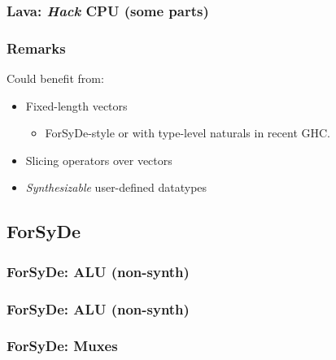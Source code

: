 \documentclass{beamer}
\begin{document}
            \begin{frame}
                \frametitle{Lava: \emph{Hack} CPU (some parts)}
            \end{frame}

            \begin{frame}
                \frametitle{Remarks}

                \par{Could benefit from:}
                \begin{itemize}
                    \item Fixed-length vectors
                        \begin{itemize}
                            \item ForSyDe-style or with type-level naturals in recent GHC.
                        \end{itemize}
                    \item Slicing operators over vectors
                    \item \emph{Synthesizable} user-defined datatypes
                \end{itemize}
            \end{frame}


        \subsection{ForSyDe}
        \label{subsec:forsyde}

            \begin{frame}
                \frametitle{ForSyDe: ALU (non-synth)}
            \end{frame}

            \begin{frame}
                \frametitle{ForSyDe: ALU (non-synth)}
            \end{frame}



            \begin{frame}
                \frametitle{ForSyDe: Muxes}
            \end{frame}
\end{document}
